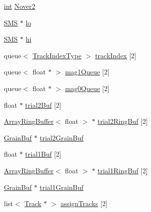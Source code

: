 \begin{DoxyCompactItemize}
\item 
\hyperlink{xmltok_8h_a5a0d4a5641ce434f1d23533f2b2e6653}{int} \hyperlink{class__sbsms___1_1_s_m_s_ab03de30d105908bd2e6b8ab0649fc110}{Nover2}
\item 
\hyperlink{class__sbsms___1_1_s_m_s}{S\+MS} $\ast$ \hyperlink{class__sbsms___1_1_s_m_s_a6353b7fc02d0ff088902dd20d8811de1}{lo}
\item 
\hyperlink{class__sbsms___1_1_s_m_s}{S\+MS} $\ast$ \hyperlink{class__sbsms___1_1_s_m_s_ac814c6d294986bb11c5d281ca90ddf9a}{hi}
\item 
queue$<$ \hyperlink{namespace__sbsms___a92908dbd644f9cd709ffe3608e9e4510}{Track\+Index\+Type} $>$ \hyperlink{class__sbsms___1_1_s_m_s_a2b383b40c04d4b557e29d80f0a4cf45d}{track\+Index} \mbox{[}2\mbox{]}
\item 
queue$<$ float $\ast$ $>$ \hyperlink{class__sbsms___1_1_s_m_s_ad60b2267d0b7d265b7b05cb4109ce16e}{mag1\+Queue} \mbox{[}2\mbox{]}
\item 
queue$<$ float $\ast$ $>$ \hyperlink{class__sbsms___1_1_s_m_s_a0718982012b902fba72e3e3ef089a95d}{mag0\+Queue} \mbox{[}2\mbox{]}
\item 
float $\ast$ \hyperlink{class__sbsms___1_1_s_m_s_ac81c4d6e4e662c0e8eeaea6e64b26899}{trial2\+Buf} \mbox{[}2\mbox{]}
\item 
\hyperlink{class__sbsms___1_1_array_ring_buffer}{Array\+Ring\+Buffer}$<$ float $>$ $\ast$ \hyperlink{class__sbsms___1_1_s_m_s_a8037e6c4be417e5e3c8e18c6fb142f83}{trial2\+Ring\+Buf} \mbox{[}2\mbox{]}
\item 
\hyperlink{class__sbsms___1_1_grain_buf}{Grain\+Buf} $\ast$ \hyperlink{class__sbsms___1_1_s_m_s_a3509d03504eb91a5d87bd460356ece6f}{trial2\+Grain\+Buf}
\item 
float $\ast$ \hyperlink{class__sbsms___1_1_s_m_s_ae582c65ec175a547811687fe9fc87422}{trial1\+Buf} \mbox{[}2\mbox{]}
\item 
\hyperlink{class__sbsms___1_1_array_ring_buffer}{Array\+Ring\+Buffer}$<$ float $>$ $\ast$ \hyperlink{class__sbsms___1_1_s_m_s_a54d9cf11bc15ac0f5e60841941962ef8}{trial1\+Ring\+Buf} \mbox{[}2\mbox{]}
\item 
\hyperlink{class__sbsms___1_1_grain_buf}{Grain\+Buf} $\ast$ \hyperlink{class__sbsms___1_1_s_m_s_af922869082cd58fe5251992f04b243d0}{trial1\+Grain\+Buf}
\item 
list$<$ \hyperlink{class__sbsms___1_1_track}{Track} $\ast$ $>$ \hyperlink{class__sbsms___1_1_s_m_s_af6ac437207069de23cb5b2d999574a13}{assign\+Tracks} \mbox{[}2\mbox{]}
\item 

\end{DoxyCompactItemize}
